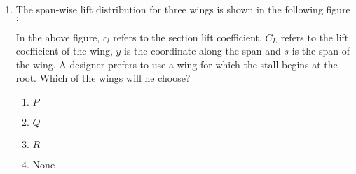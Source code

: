 \documentclass[journal]{IEEEtran}
\begin{document}
\begin{enumerate}

    For $p_1\textgreater p_\infty$ which of the following statements is NOT true?
    \begin{enumerate}
        \item For $p_1\textless p_d$, the expansion fan from $A$ gets reflected from $B$ as a compression wave
        \item For $p_1\textgreater p_d$, the expansion fan from $A$ gets reflectd from $B$ as an expansion wave
        \item For $p_1\textless p_d$, the expansion fan from $A$ gets reflected from $B$ as an expansion wave
        \item For $p_1\textgreater p_d$, $B$ always sees an expansion
    \end{enumerate}
    \item The span-wise lift distribution for three wings is shown in the following figure$\colon$

In the above figure, $c_l$ refers to the section lift coefficient, $C_L$ refers to the lift coefficient of the wing, $y$ is the coordinate along the span and $s$ is the span of the wing. A designer prefers to use a wing for which the stall begins at the root. Which of the wings will he choose?
    \begin{enumerate}
        \item $P$
        \item $Q$
        \item $R$
        \item None
    \end{enumerate}
\end{enumerate}
\end{document}
